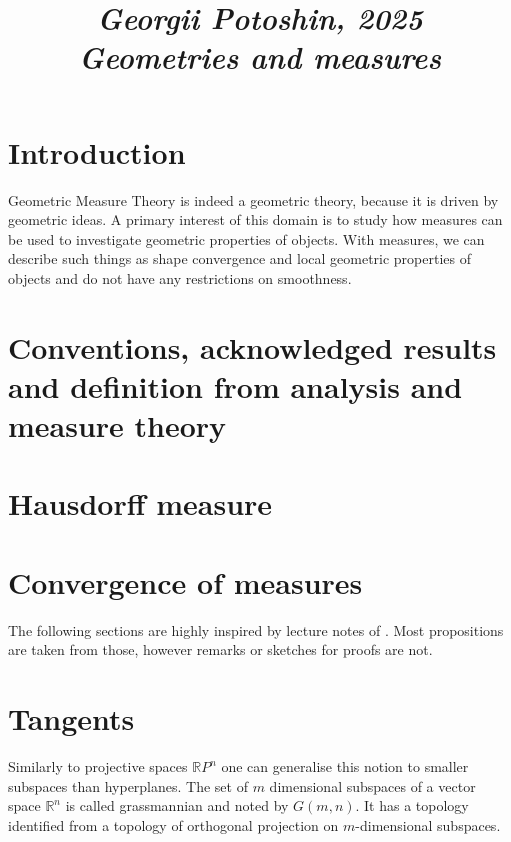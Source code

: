 \documentclass{article}
\begin{document}
\title{
\vspace{-1cm}
\textit{\small{Georgii Potoshin, 2025}}\\
\vspace{0.3ex}
\textit{\huge{Geometries and measures}}\vspace{1ex}
}
\date{\vspace{-5ex}}
\maketitle

\section{Introduction}
Geometric Measure Theory is indeed a geometric theory, because it is
driven by geometric ideas. A primary interest of this domain is to study how
measures can be used to investigate geometric properties of objects. With measures,
we can describe such things as shape convergence and local geometric properties
of objects and do not have any restrictions on smoothness.

\section{Conventions, acknowledged results and definition from analysis and measure theory}


\section{Hausdorff measure}


\section{Convergence of measures}


The following sections are highly inspired by lecture notes of \cite{giovanni_alberti}.
Most propositions are taken from those, however remarks or sketches for proofs
are not.

\section{Tangents}

Similarly to projective spaces $\mathbb{R}P^n$ one can generalise this notion to
smaller subspaces than hyperplanes. The set of $m$ dimensional subspaces of a
vector space $\mathbb{R}^n$ is called grassmannian and noted by $G(m,n)$. It
has a topology identified from a topology of orthogonal projection on
$m$-dimensional subspaces.
\end{document}
